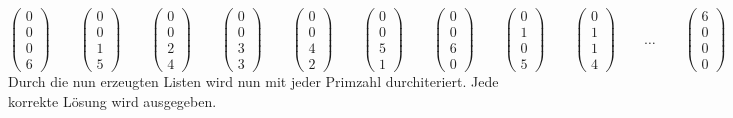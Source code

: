 \documentclass[10pt, fleqn]{article}
\begin{document}
\[ \begin{pmatrix}0\\0\\0\\6\end{pmatrix} \qquad 
   \begin{pmatrix}0\\0\\1\\5\end{pmatrix} \qquad 
   \begin{pmatrix}0\\0\\2\\4\end{pmatrix} \qquad 
   \begin{pmatrix}0\\0\\3\\3\end{pmatrix} \qquad 
   \begin{pmatrix}0\\0\\4\\2\end{pmatrix} \qquad 
   \begin{pmatrix}0\\0\\5\\1\end{pmatrix} \qquad 
   \begin{pmatrix}0\\0\\6\\0\end{pmatrix} \qquad 
   \begin{pmatrix}0\\1\\0\\5\end{pmatrix} \qquad 
   \begin{pmatrix}0\\1\\1\\4\end{pmatrix} \qquad 
   \dots \qquad
   \begin{pmatrix}6\\0\\0\\0\end{pmatrix} \qquad \]
Durch die nun erzeugten Listen wird nun mit jeder Primzahl durchiteriert. Jede 
korrekte Lösung wird ausgegeben. 
% 
\end{document}

